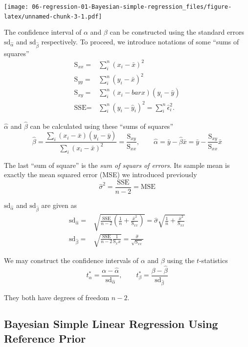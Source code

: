 \documentclass[]{book}
\theoremstyle{definition}
\theoremstyle{definition}
\theoremstyle{definition}
\theoremstyle{remark}
\begin{document}
\texttt{[image: 06-regression-01-Bayesian-simple-regression\_files/figure-latex/unnamed-chunk-3-1.pdf]}

The confidence interval of \(\alpha\) and \(\beta\) can be constructed
using the standard errors \(\text{sd}_{\hat{\alpha}}\) and
\(\text{sd}_{\hat{\beta}}\) respectively. To proceed, we introduce
notations of some ``sums of squares'' \[
\begin{aligned}
\text{S}_{xx} = & \sum_i^n (x_i-\bar{x})^2\\
\text{S}_{yy} = & \sum_i^n (y_i-\bar{x})^2 \\
\text{S}_{xy} = & \sum_i^n (x_i-bar{x})(y_i-\bar{y}) \\
\text{SSE}    = & \sum_i^n (y_i-\hat{y}_i)^2 = \sum_i^n \hat{\epsilon}_i^2. 
\end{aligned}
\]

\(\hat{\alpha}\) and \(\hat{\beta}\) can be calculated using these
``sums of squares''
\[ \hat{\beta} = \frac{\sum_i (x_i-\bar{x})(y_i-\bar{y})}{\sum_i (x_i-\bar{x})^2} = \frac{\text{S}_{xy}}{\text{S}_{xx}},\qquad \hat{\alpha} = \bar{y} - \hat{\beta}\bar{x} = \bar{y}-\frac{\text{S}_{xy}}{\text{S}_{xx}}\bar{x} \]

The last ``sum of square'' is the \emph{sum of squars of errors}. Its
sample mean is exactly the mean squared error (MSE) we introduced
previously \[
\hat{\sigma}^2 = \frac{\text{SSE}}{n-2} = \text{MSE}
\]

\(\text{sd}_{\hat{\alpha}}\) and \(\text{sd}_{\hat{\beta}}\) are given
as \[ 
\begin{aligned}
\text{sd}_{\hat{\alpha}} = &  \sqrt{\frac{\text{SSE}}{n-2}\left(\frac{1}{n}+\frac{\bar{x}^2}{\text{S}_{xx}}\right)} = \hat{\sigma}\sqrt{\frac{1}{n}+\frac{\bar{x}^2}{\text{S}_{xx}}}\\
\text{sd}_{\hat{\beta}} = & \sqrt{\frac{\text{SSE}}{n-2}\frac{1}{\text{S}_xx}} = \frac{\hat{\sigma}}{\sqrt{\text{S}_{xx}}}
\end{aligned}
\]

We may construct the confidence intervals of \(\alpha\) and \(\beta\)
using the \(t\)-statistics \[ 
t_\alpha^\ast = \frac{\alpha - \hat{\alpha}}{\text{sd}_{\hat{\alpha}}},\qquad t_\beta^\ast = \frac{\beta-\hat{\beta}}{\text{sd}_{\hat{\beta}}} 
\]

They both have degrees of freedom \(n-2\).

\subsection{Bayesian Simple Linear Regression Using Reference
Prior}\label{bayesian-simple-linear-regression-using-reference-prior}
\end{document}
